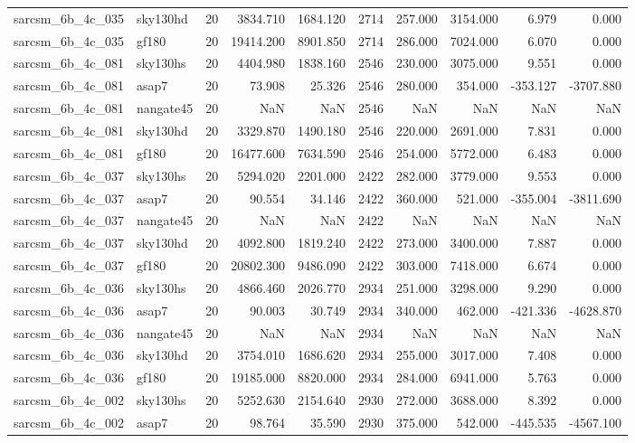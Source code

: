 \begin{tabular}{llrrrrrrrr}
sarcsm\_6b\_4c\_035 & sky130hd & 20 & 3834.710 & 1684.120 & 2714 & 257.000 & 3154.000 & 6.979 & 0.000 \\
sarcsm\_6b\_4c\_035 & gf180 & 20 & 19414.200 & 8901.850 & 2714 & 286.000 & 7024.000 & 6.070 & 0.000 \\
sarcsm\_6b\_4c\_081 & sky130hs & 20 & 4404.980 & 1838.160 & 2546 & 230.000 & 3075.000 & 9.551 & 0.000 \\
sarcsm\_6b\_4c\_081 & asap7 & 20 & 73.908 & 25.326 & 2546 & 280.000 & 354.000 & -353.127 & -3707.880 \\
sarcsm\_6b\_4c\_081 & nangate45 & 20 & NaN & NaN & 2546 & NaN & NaN & NaN & NaN \\
sarcsm\_6b\_4c\_081 & sky130hd & 20 & 3329.870 & 1490.180 & 2546 & 220.000 & 2691.000 & 7.831 & 0.000 \\
sarcsm\_6b\_4c\_081 & gf180 & 20 & 16477.600 & 7634.590 & 2546 & 254.000 & 5772.000 & 6.483 & 0.000 \\
sarcsm\_6b\_4c\_037 & sky130hs & 20 & 5294.020 & 2201.000 & 2422 & 282.000 & 3779.000 & 9.553 & 0.000 \\
sarcsm\_6b\_4c\_037 & asap7 & 20 & 90.554 & 34.146 & 2422 & 360.000 & 521.000 & -355.004 & -3811.690 \\
sarcsm\_6b\_4c\_037 & nangate45 & 20 & NaN & NaN & 2422 & NaN & NaN & NaN & NaN \\
sarcsm\_6b\_4c\_037 & sky130hd & 20 & 4092.800 & 1819.240 & 2422 & 273.000 & 3400.000 & 7.887 & 0.000 \\
sarcsm\_6b\_4c\_037 & gf180 & 20 & 20802.300 & 9486.090 & 2422 & 303.000 & 7418.000 & 6.674 & 0.000 \\
sarcsm\_6b\_4c\_036 & sky130hs & 20 & 4866.460 & 2026.770 & 2934 & 251.000 & 3298.000 & 9.290 & 0.000 \\
sarcsm\_6b\_4c\_036 & asap7 & 20 & 90.003 & 30.749 & 2934 & 340.000 & 462.000 & -421.336 & -4628.870 \\
sarcsm\_6b\_4c\_036 & nangate45 & 20 & NaN & NaN & 2934 & NaN & NaN & NaN & NaN \\
sarcsm\_6b\_4c\_036 & sky130hd & 20 & 3754.010 & 1686.620 & 2934 & 255.000 & 3017.000 & 7.408 & 0.000 \\
sarcsm\_6b\_4c\_036 & gf180 & 20 & 19185.000 & 8820.000 & 2934 & 284.000 & 6941.000 & 5.763 & 0.000 \\
sarcsm\_6b\_4c\_002 & sky130hs & 20 & 5252.630 & 2154.640 & 2930 & 272.000 & 3688.000 & 8.392 & 0.000 \\
sarcsm\_6b\_4c\_002 & asap7 & 20 & 98.764 & 35.590 & 2930 & 375.000 & 542.000 & -445.535 & -4567.100 \\

\end{tabular}

